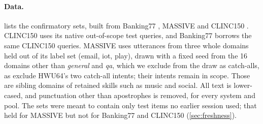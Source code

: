 \documentclass[11pt]{article}
\begin{document}
\paragraph{Data.}  lists the confirmatory sets, built from Banking77 \citep{casanueva2020banking77}, MASSIVE \citep{fitzgerald2022massive} and CLINC150 \citep{larson2019clinc}. CLINC150 uses its native out-of-scope test queries, and Banking77 borrows the same CLINC150 queries. MASSIVE uses utterances from three whole domains held out of its label set (email, iot, play), drawn with a fixed seed from the 16 domains other than \emph{general} and \emph{qa}, which we exclude from the draw as catch-alls, as \citet{li2024catchall} exclude HWU64's two catch-all intents; their intents remain in scope. Those are sibling domains of retained skills such as music and social. All text is lower-cased, and punctuation other than apostrophes is removed, for every system and pool. The sets were meant to contain only test items no earlier session used; that held for MASSIVE but not for Banking77 and CLINC150 (\cref{sec:freshness}).

\begin{table}[t]
\centering\small
{}
\caption{Confirmatory sets. \emph{Never seen}: turns whose normalised text appears in no session built earlier (\cref{sec:freshness}). MASSIVE's in-scope turns cover 21 of its 42 labels.}
\label{tab:data}
\end{table}
\end{document}
